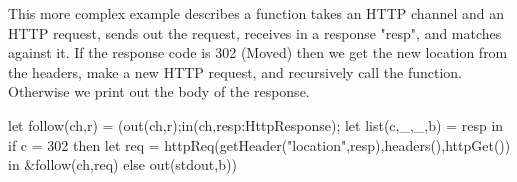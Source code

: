 This more complex example describes a function takes an HTTP channel and an HTTP request, sends out the request, receives in a response "resp", and matches against it. If the response code is 302 (Moved) then we get the new location from the headers, make a new HTTP request, and recursively call the function. Otherwise we print out the body of the response.
\label{eg:recursivecall}
\begin{code}
let follow(ch,r) = (out(ch,r);in(ch,resp:HttpResponse);
    let list(c,_,_,b) = resp in
        if c = 302 
            then let req = httpReq(getHeader("location",resp),headers(),httpGet()) in 
                &follow(ch,req) 
            else out(stdout,b)) 
\end{code}
